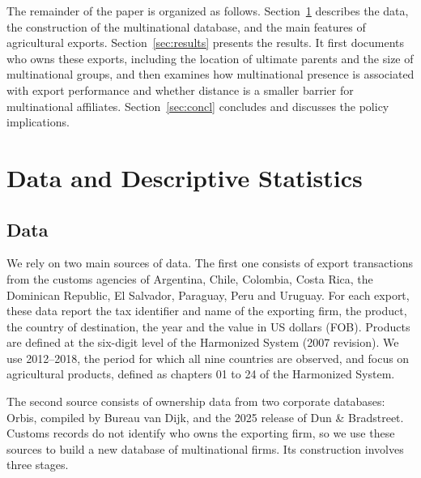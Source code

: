 \documentclass[11pt,a4paper]{article}
\begin{document}
The remainder of the paper is organized as follows. Section~\ref{sec:data} describes the data,
the construction of the multinational database, and the main features of agricultural exports.
Section~\ref{sec:results} presents the results. It first documents who owns these exports,
including the location of ultimate parents and the size of multinational groups, and then examines
how multinational presence is associated with export performance and whether distance is a smaller
barrier for multinational affiliates. Section~\ref{sec:concl} concludes and discusses the policy implications.

\section{Data and Descriptive Statistics}\label{sec:data}
\subsection{Data}\label{sec:data_data}

We rely on two main sources of data. The first one consists of export transactions from the
customs agencies of Argentina, Chile, Colombia, Costa Rica, the Dominican Republic, El Salvador,
Paraguay, Peru and Uruguay. For each export, these data report the tax identifier and name of the
exporting firm, the product, the country of destination, the year and the value in US dollars
(FOB). Products are defined at the six-digit level of the Harmonized System (2007 revision). We use 2012--2018, the period for which all nine countries are observed, and focus on agricultural
products, defined as chapters 01 to 24 of the Harmonized System.

The second source consists of ownership data from two corporate databases: Orbis, compiled by
Bureau van Dijk, and the 2025 release of Dun \& Bradstreet. Customs records do not identify who
owns the exporting firm, so we use these sources to build a new database of multinational firms.
Its construction involves three stages.
\end{document}
